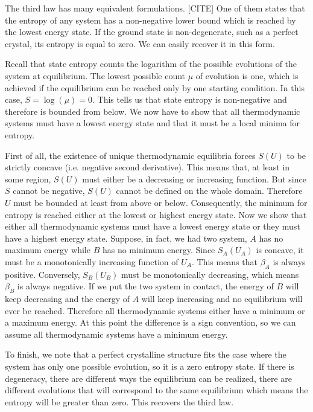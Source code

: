 \documentclass[letterpaper,twocolumn]{article}
\begin{document}
The third law has many equivalent formulations. [CITE] One of them states that the entropy of any system has a non-negative lower bound which is reached by the lowest energy state. If the ground state is non-degenerate, such as a perfect crystal, its entropy is equal to zero. We can easily recover it in this form.

Recall that state entropy counts the logarithm of the possible evolutions of the system at equilibrium. The lowest possible count $\mu$ of evolution is one, which is achieved if the equilibrium can be reached only by one starting condition. In this case, $S=\log(\mu)=0$. This tells us that state entropy is non-negative and therefore is bounded from below. We now have to show that all thermodynamic systems must have a lowest energy state and that it must be a local minima for entropy.

First of all, the existence of unique thermodynamic equilibria forces $S(U)$ to be strictly concave (i.e. negative second derivative). This means that, at least in some region, $S(U)$ must either be a decreasing or increasing function. But since $S$ cannot be negative, $S(U)$ cannot be defined on the whole domain. Therefore $U$ must be bounded at least from above or below. Consequently, the minimum for entropy is reached either at the lowest or highest energy state. Now we show that either all thermodynamic systems must have a lowest energy state or they must have a highest energy state. Suppose, in fact, we had two system, $A$ has no maximum energy while $B$ has no minimum energy. Since $S_A(U_A)$ is concave, it must be a monotonically increasing function of $U_A$. This means that $\beta_A$ is always positive. Conversely, $S_B(U_B)$ must be monotonically decreasing, which means $\beta_B$ is always negative. If we put the two system in contact, the energy of $B$ will keep decreasing and the energy of $A$ will keep increasing and no equilibrium will ever be reached. Therefore all thermodynamic systems either have a minimum or a maximum energy. At this point the difference is a sign convention, so we can assume all thermodynamic systems have a minimum energy.

To finish, we note that a perfect crystalline structure fits the case where the system has only one possible evolution, so it is a zero entropy state. If there is degeneracy, there are different ways the equilibrium can be realized, there are different evolutions that will correspond to the same equilibrium which means the entropy will be greater than zero. This recovers the third law.
\end{document}
